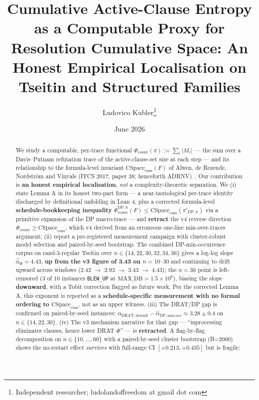 \documentclass[11pt,a4paper]{article}
\title{Cumulative Active-Clause Entropy as a Computable Proxy for Resolution
Cumulative Space: An Honest Empirical Localisation on Tseitin and Structured
Families}
\author{Ludovico Kubler\thanks{Independent researcher;
ludolandoffreedom at gmail dot com}}
\date{June 2026}
\theoremstyle{remark}
\begin{document}
\maketitle

\begin{abstract}
\sloppypar
We study a computable, per-trace functional
$\Phi_{\mathrm{count}}(\pi) := \sum_t |M_t|$ --- the sum over a
Davis--Putnam refutation trace of the active-clause-set size at each step ---
and its relationship to the formula-level invariant
$\mathrm{CSpace}_{\mathrm{cum}}(F)$ of Alwen, de Rezende, Nordstr\"om and
Vinyals (ITCS 2017, paper 38; henceforth ADRNV)~\cite{ADRNV2017}. Our
contribution is \textbf{an honest empirical localisation}, \emph{not} a
complexity-theoretic separation. We (i) state Lemma A in its honest two-part
form --- a near-tautological per-trace identity discharged by definitional
unfolding in Lean 4, plus a corrected formula-level
\textbf{schedule-bookkeeping inequality}
$\Phi_{\mathrm{count}}^{\mathrm{DP},h}(F) \le
\mathrm{CSpace}_{\mathrm{cum}}(\pi'_{\mathrm{DP},h})$ via a primitive
expansion of the DP macro-trace --- and \textbf{retract} the v4 reverse
direction $\Phi_{\mathrm{count}} \ge \mathrm{CSpace}_{\mathrm{cum}}$, which
v4 derived from an erroneous one-line min-over-traces argument; (ii) report
a pre-registered measurement campaign with cluster-robust model selection
and paired-by-seed bootstrap. The combined DP-min-occurrence corpus on
rand-3-regular Tseitin over $n \in \{14, 22, 30, 32, 34, 36\}$ gives a
log-log slope $\widehat\alpha_{\Phi} = 4.43$, \textbf{up from the v3 figure
of 3.43 on $n = 10\text{--}30$} and continuing to drift upward across
windows (2.42 $\to$ 2.93 $\to$ 3.43 $\to$ 4.43); the $n=36$ point is
left-censored (3 of 10 instances \texttt{BLEW\_UP} at
$\mathrm{MAX\_DB} = 1.5 \times 10^6$), biasing the slope
\textbf{downward}, with a Tobit correction flagged as future work. Per the
corrected Lemma A, this exponent is reported as a
\textbf{schedule-specific measurement with no formal ordering to
$\mathrm{CSpace}_{\mathrm{cum}}$}, not as an upper witness.
(iii) The DRAT/DP gap is confirmed on paired-by-seed instances:
$\widehat\alpha_{\mathrm{DRAT,default}} -
\widehat\alpha_{\mathrm{DP,min\text{-}occ}} \approx 3.28 \pm 0.4$
on $n \in \{14, 22, 30\}$. (iv) The v3 mechanism narrative for that gap
--- ``inprocessing eliminates clauses, hence lower DRAT $\Phi$'' --- is
\textbf{retracted}. A flag-by-flag decomposition on $n \in \{10, \ldots, 60\}$
with a paired-by-seed cluster bootstrap (B=2000) shows the no-restart
effect \emph{survives} with full-range CI $[+0.213, +0.435]$ but is fragile:

\end{abstract}
\end{document}
